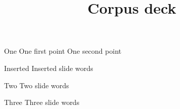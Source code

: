 \documentclass{beamer}
\title{Corpus deck}
\begin{document}
\begin{frame}{One}
  One first point \pause One second point
\end{frame}
\begin{frame}{Inserted}
  Inserted slide words
\end{frame}
\begin{frame}{Two}
  Two slide words
\end{frame}
\begin{frame}{Three}
  Three slide words
\end{frame}
\end{document}
